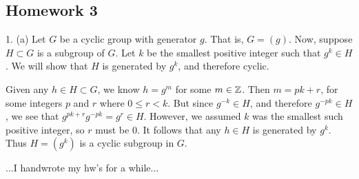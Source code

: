 \subsection{Homework 3}
1. (a) Let $G$ be a cyclic group with generator $g$. That is, $G = (g)$. Now, suppose $H \subset G$ is a subgroup of $G$. Let $k$ be the smallest positive integer such that $g^k \in H$. We will show that $H$ is generated by $g^k$, and therefore cyclic.

Given any $h \in H \subset G$, we know $h = g^m$ for some $m \in \mathbb{Z}$. Then $m = pk + r$, for some integers $p$ and $r$ where $0 \leq r < k$. But since $g^{-k} \in H$, and therefore $g^{-pk} \in H$, we see that $g^{pk + r}g^{-pk} = g^r \in H$. However, we assumed $k$ was the smallest such positive integer, so $r$ must be 0. It follows that any $h \in H$ is generated by $g^k$. Thus $H = (g^k)$ is a cyclic subgroup in $G$.

...I handwrote my hw's for a while...